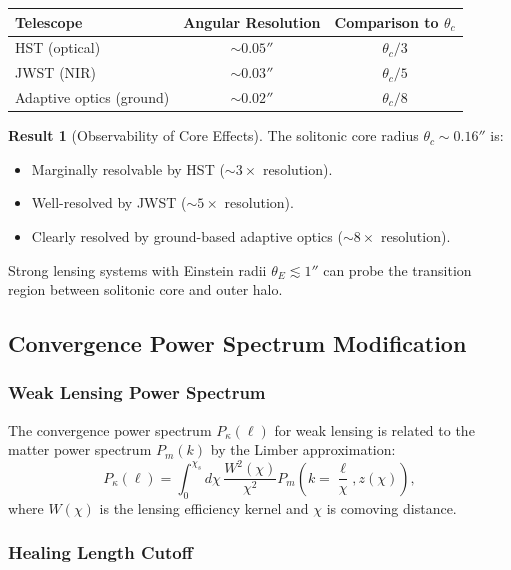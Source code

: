 \documentclass[11pt,a4paper]{article}
\theoremstyle{definition}
\newtheorem{result}{Result}[section]
\theoremstyle{remark}
\begin{document}
\begin{center}
\begin{tabular}{@{}lcc@{}}
\toprule
\textbf{Telescope} & \textbf{Angular Resolution} & \textbf{Comparison to $\theta_c$} \\
\midrule
HST (optical) & $\sim 0.05''$ & $\theta_c / 3$ \\
JWST (NIR) & $\sim 0.03''$ & $\theta_c / 5$ \\
Adaptive optics (ground) & $\sim 0.02''$ & $\theta_c / 8$ \\
\bottomrule
\end{tabular}
\end{center}

\begin{result}[Observability of Core Effects]
The solitonic core radius $\theta_c \sim 0.16''$ is:
\begin{itemize}
\item Marginally resolvable by HST ($\sim 3 \times$ resolution).
\item Well-resolved by JWST ($\sim 5 \times$ resolution).
\item Clearly resolved by ground-based adaptive optics ($\sim 8 \times$ resolution).
\end{itemize}
Strong lensing systems with Einstein radii $\theta_E \lesssim 1''$ can probe the transition region between solitonic core and outer halo.
\end{result}

\subsection{Convergence Power Spectrum Modification}
\label{sec:power_spectrum}

\subsubsection{Weak Lensing Power Spectrum}

The convergence power spectrum $P_\kappa(\ell)$ for weak lensing is related to the matter power spectrum $P_m(k)$ by the Limber approximation:
\begin{equation}
P_\kappa(\ell) = \int_0^{\chi_s} d\chi \, \frac{W^2(\chi)}{\chi^2} P_m\left(k = \frac{\ell}{\chi}, z(\chi)\right),
\end{equation}
where $W(\chi)$ is the lensing efficiency kernel and $\chi$ is comoving distance.

\subsubsection{Healing Length Cutoff}
\end{document}
